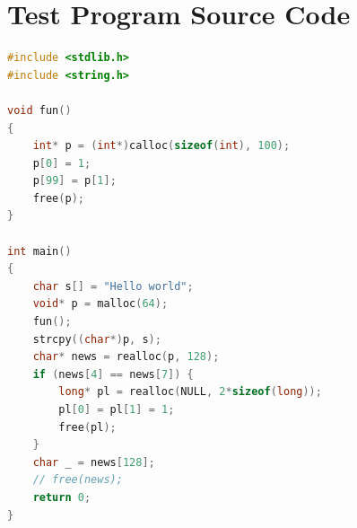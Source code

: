 \documentclass[letterpaper,twocolumn,10pt]{article}
\begin{document}
{\footnotesize 
}

\appendix

\section{Test Program Source Code}
\label{app:test}

\begin{lstlisting}[language=c]
#include <stdlib.h>
#include <string.h>

void fun()
{
    int* p = (int*)calloc(sizeof(int), 100);
    p[0] = 1;
    p[99] = p[1];
    free(p);
}

int main()
{
    char s[] = "Hello world";
    void* p = malloc(64);
    fun();
    strcpy((char*)p, s);
    char* news = realloc(p, 128);
    if (news[4] == news[7]) {
        long* pl = realloc(NULL, 2*sizeof(long));
        pl[0] = pl[1] = 1;
        free(pl);
    }
    char _ = news[128];
    // free(news);
    return 0;
}
\end{lstlisting}
\end{document}
